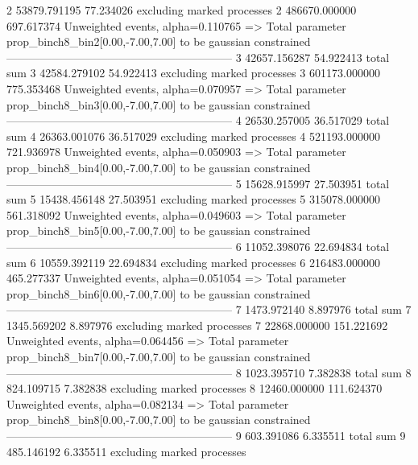 2          53879.791195    77.234026       excluding marked processes    
2          486670.000000   697.617374      Unweighted events, alpha=0.110765
  => Total parameter prop_binch8_bin2[0.00,-7.00,7.00] to be gaussian constrained
------------------------------------------------------------
3          42657.156287    54.922413       total sum                     
3          42584.279102    54.922413       excluding marked processes    
3          601173.000000   775.353468      Unweighted events, alpha=0.070957
  => Total parameter prop_binch8_bin3[0.00,-7.00,7.00] to be gaussian constrained
------------------------------------------------------------
4          26530.257005    36.517029       total sum                     
4          26363.001076    36.517029       excluding marked processes    
4          521193.000000   721.936978      Unweighted events, alpha=0.050903
  => Total parameter prop_binch8_bin4[0.00,-7.00,7.00] to be gaussian constrained
------------------------------------------------------------
5          15628.915997    27.503951       total sum                     
5          15438.456148    27.503951       excluding marked processes    
5          315078.000000   561.318092      Unweighted events, alpha=0.049603
  => Total parameter prop_binch8_bin5[0.00,-7.00,7.00] to be gaussian constrained
------------------------------------------------------------
6          11052.398076    22.694834       total sum                     
6          10559.392119    22.694834       excluding marked processes    
6          216483.000000   465.277337      Unweighted events, alpha=0.051054
  => Total parameter prop_binch8_bin6[0.00,-7.00,7.00] to be gaussian constrained
------------------------------------------------------------
7          1473.972140     8.897976        total sum                     
7          1345.569202     8.897976        excluding marked processes    
7          22868.000000    151.221692      Unweighted events, alpha=0.064456
  => Total parameter prop_binch8_bin7[0.00,-7.00,7.00] to be gaussian constrained
------------------------------------------------------------
8          1023.395710     7.382838        total sum                     
8          824.109715      7.382838        excluding marked processes    
8          12460.000000    111.624370      Unweighted events, alpha=0.082134
  => Total parameter prop_binch8_bin8[0.00,-7.00,7.00] to be gaussian constrained
------------------------------------------------------------
9          603.391086      6.335511        total sum                     
9          485.146192      6.335511        excluding marked processes    
